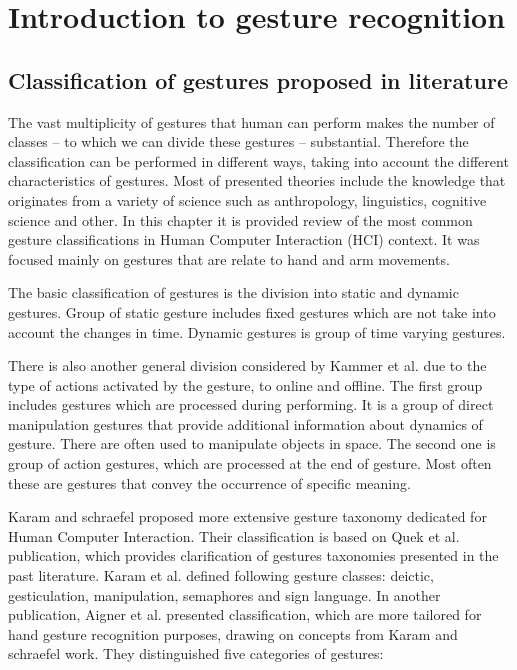 \chapter{Introduction to gesture recognition}

\section{Classification of gestures proposed in literature}
The vast multiplicity of gestures that human can perform makes the number of classes -- to which we can divide these gestures -- substantial. Therefore the classification can be performed in different ways, taking into account the different characteristics of gestures. Most of presented theories include the knowledge that originates from a variety of science such as anthropology, linguistics, cognitive science and other. In this chapter it is provided review of the most common gesture classifications in Human Computer Interaction (HCI) context. It was focused mainly on gestures that are relate to hand and arm movements.

The basic classification of gestures is the division into static and dynamic gestures. Group of static gesture includes fixed gestures which are not take into account the changes in time. Dynamic gestures is group of time varying gestures.

There is also another general division considered by Kammer et al. \cite{kammer_taxonomy_2010} due to the type of actions activated by the gesture, to online and offline. The first group includes gestures which are processed during performing. It is a group of direct manipulation gestures that provide additional information about dynamics of gesture. There are often used to manipulate objects in space. The second one is group of action gestures, which are processed at the end of gesture. Most often these are gestures that convey the occurrence of specific meaning.

Karam and schraefel \cite{Karam05ataxonomy} proposed more extensive gesture taxonomy dedicated for Human Computer Interaction. Their classification is based on Quek et al. \cite{Quek:2002:MHD:568513.568514} publication, which provides clarification of gestures taxonomies presented in the past literature. Karam et al. defined following gesture classes: deictic, gesticulation, manipulation, semaphores and sign language. In another publication, Aigner et al. \cite{AignerTaxonomy} presented classification, which are more tailored for hand gesture recognition purposes, drawing on concepts from Karam and schraefel work. They distinguished five categories of gestures:

